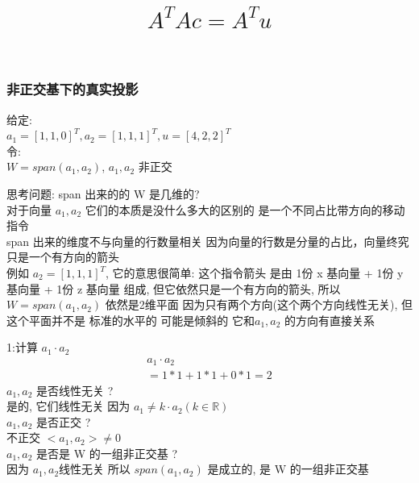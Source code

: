 \documentclass[12pt]{article}
\title{$A^{T}Ac = A^{T}u$}
\date{}
\begin{document}
\maketitle

\begin{flushleft}
    \subsubsection{非正交基下的真实投影}
    给定: \\
    $a_{1} = [1 ,1 ,0]^{T}, a_{2} = [1, 1, 1]^{T}, u = [4, 2, 2]^{T}$ \\
    令: \\
    $W = span(a_{1},a_{2})$, $a_{1},a_{2}$ 非正交

    思考问题: span 出来的的 W 是几维的? \\
    对于向量 $a_{1},a_{2}$ 它们的本质是没什么多大的区别的 是一个不同占比带方向的移动指令 \\
    span 出来的维度不与向量的行数量相关 因为向量的行数是分量的占比，向量终究只是一个有方向的箭头\\
    例如 $a_{2} = [1, 1, 1]^{T}$, 它的意思很简单: 这个指令箭头 是由 1份 x 基向量 + 1份 y 基向量 + 1份 z 基向量
    组成, 但它依然只是一个有方向的箭头, 所以 $W = span(a_{1},a_{2})$ 依然是2维平面 因为只有两个方向(这个两个方向线性无关), 但这个平面并不是
    标准的水平的 可能是倾斜的 它和$a_{1},a_{2}$ 的方向有直接关系

    1:计算 $a_{1} \cdot a_{2}$ \\
    \begin{align}
        a_{1} \cdot a_{2} \\
        = 1 * 1 + 1 * 1 + 0 * 1
        = 2
    \end{align}
    $a_{1},a_{2}$ 是否线性无关 ? \\
    是的, 它们线性无关 因为 $a_{1} \neq k \cdot a_{2} (k \in \mathbb{R})$ \\
    $a_{1},a_{2}$ 是否正交 ? \\
    不正交 $<a_{1},a_{2}> \neq  0 $ \\
    $a_{1},a_{2}$ 是否是 W 的一组非正交基 ? \\
    因为 $a_{1},a_{2}$线性无关 所以 $span(a_{1},a_{2})$ 是成立的, 是 W 的一组非正交基 \\


\end{flushleft}
\end{document}
